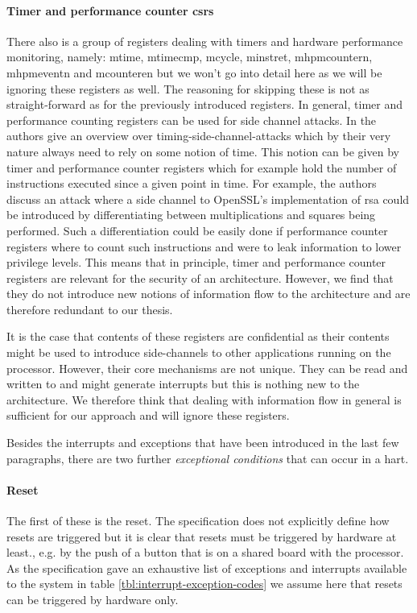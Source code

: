 \paragraph{Timer and performance counter \glspl{csr}}
There also is a group of registers dealing with timers and hardware performance monitoring, namely: \gls{mtime}, \gls{mtimecmp}, \gls{mcycle}, \gls{minstret}, \gls{mhpmcountern}, \gls{mhpmeventn} and \gls{mcounteren} but we won't go into detail here as we will be ignoring these registers as well.
The reasoning for skipping these is not as straight-forward as for the previously introduced registers.
In general, timer and performance counting registers can be used for side channel attacks.
In \cite{Qian16} the authors give an overview over timing-side-channel-attacks which by their very nature always need to rely on some notion of time.
This notion can be given by timer and performance counter registers which for example hold the number of instructions executed since a given point in time.
For example, the authors discuss an attack where a side channel to OpenSSL's implementation of \gls{rsa} could be introduced by differentiating between multiplications and squares being performed.
Such a differentiation could be easily done if performance counter registers where to count such instructions and were to leak information to lower privilege levels.
This means that in principle, timer and performance counter registers are relevant for the security of an architecture.
However, we find that they do not introduce new notions of information flow to the architecture and are therefore redundant to our thesis.

It is the case that contents of these registers are confidential as their contents might be used to introduce side-channels to other applications running on the processor.
However, their core mechanisms are not unique.
They can be read and written to and might generate interrupts but this is nothing new to the architecture.
We therefore think that dealing with information flow in general is sufficient for our approach and will ignore these registers.

Besides the interrupts and exceptions that have been introduced in the last few paragraphs, there are two further \textit{exceptional conditions} that can occur in a \gls{hart}.

\paragraph{Reset}
The first of these is the reset.
The specification does not explicitly define how resets are triggered but it is clear that resets must be triggered by hardware at least., e.g. by the push of a button that is on a shared board with the processor.
As the specification gave an exhaustive list of exceptions and interrupts available to the system in table \ref{tbl:interrupt-exception-codes} we assume here that resets can be triggered by hardware only.

